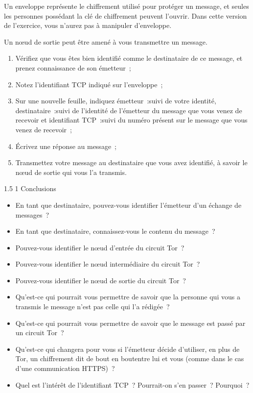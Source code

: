 \documentclass[a4paper,twoside,french]{article}
\makeatletter
\renewcommand\section{\@startsection
  {section}{1}{1cm}%
  {1.5\baselineskip}%
  {1\baselineskip}%
  {\normalfont\Large\bfseries}}%
\makeatother
\begin{document}
  Un enveloppe représente le chiffrement utilisé pour protéger un
  message, et seules les personnes possédant la clé de chiffrement
  peuvent l'ouvrir. Dans cette version de l'exercice, vous n'aurez pas
  à manipuler d'enveloppe.

  Un n\oe ud de sortie peut être amené à vous transmettre un
  message.

  \begin{enumerate}
  \item Vérifiez que vous êtes bien identifié comme le destinataire de
    ce message, et prenez connaissance de son émetteur~;
  \item Notez l'identifiant TCP indiqué sur l'enveloppe~;
  \item Sur une nouvelle feuille, indiquez \og émetteur~:\fg suivi de
    votre identité, \og destinataire~:\fg suivi de l'identité de
    l'émetteur du message que vous venez de recevoir et \og
    identifiant TCP~:\fg suivi du numéro présent sur le message que
    vous venez de recevoir~;
  \item Écrivez une réponse au message~;
  \item Transmettez votre message au destinataire que vous avez
    identifié, à savoir le n\oe ud de sortie qui vous l'a transmis.
  \end{enumerate}

  \section{Conclusions}

  \begin{itemize}
  \item En tant que destinataire, pouvez-vous identifier
    l'émetteur d'un échange de messages~?
  \item En tant que destinataire, connaissez-vous le contenu du
    message~?
  \item Pouvez-vous identifier le n\oe ud d'entrée du circuit Tor~?
  \item Pouvez-vous identifier le n\oe ud intermédiaire du circuit Tor~?
  \item Pouvez-vous identifier le n\oe ud de sortie du circuit Tor~?
  \item Qu'est-ce qui pourrait vous permettre de savoir que la
    personne qui vous a transmis le message n'est pas celle qui l'a
    rédigée~?
  \item Qu'est-ce qui pourrait vous permettre de savoir que le message
    est passé par un circuit Tor~?
  \item Qu'est-ce qui changera pour vous si l'émetteur décide
    d'utiliser, en plus de Tor, un chiffrement dit \og de bout en
    bout\fg entre lui et vous (comme dans le cas d'une
    communication HTTPS)~?
  \item Quel est l'intérêt de l'identifiant TCP~? Pourrait-on s'en
    passer~? Pourquoi~?
  \end{itemize}

  
		
\end{document}
